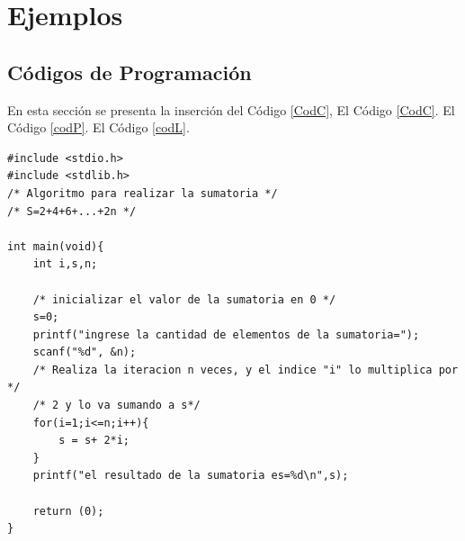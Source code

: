 
\newpage
\section{Ejemplos}
\subsection{Códigos de Programación}
En esta sección se presenta la inserción del Código \ref{CodC}, El Código \ref{CodC}. El Código \ref{codP}. El Código \ref{codL}.



\lstset{language=C}
\begin{lstlisting}[caption = C\'odigo en C de una sumatoria, label = CodC]
#include <stdio.h>
#include <stdlib.h>
/* Algoritmo para realizar la sumatoria */
/* S=2+4+6+...+2n */

int main(void){
	int i,s,n;
	
	/* inicializar el valor de la sumatoria en 0 */
	s=0;
	printf("ingrese la cantidad de elementos de la sumatoria=");
	scanf("%d", &n);
	/* Realiza la iteracion n veces, y el indice "i" lo multiplica por */
	/* 2 y lo va sumando a s*/
	for(i=1;i<=n;i++){
		s = s+ 2*i;
	} 
	printf("el resultado de la sumatoria es=%d\n",s);

	return (0);
}
\end{lstlisting}

